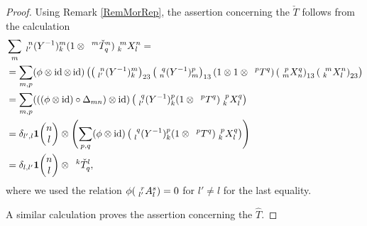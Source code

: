 \begin{proof}
 Using Remark \ref{RemMorRep}, the assertion concerning the $\check{T}$ follows
  from the calculation
  \begin{align*}
    &\sum_{m} \Gr{(Y^{-1})}{n}{m}{l'}{k}(1 \otimes
    \Gru{\check{T}_q}{m}{n})\Gr{X}{m}{n}{k}{l} = \\
    &=\sum_{m,p} (\phi \otimes \id \otimes
    \id)\left(\left(\Gr{(Y^{-1})}{n}{m}{l'}{k}\right)_{23}
      \left(\Gr{(Y^{-1})}{q}{p}{n}{m}\right)_{13}(1 \otimes 1 \otimes
      \Gru{T}{p}{q})\left(\Gr{X}{p}{q}{m}{n}\right)_{13}\left(\Gr{X}{m}{n}{k}{l}\right)_{23}\right)
    \\
    &= \sum_{m,p} (\left((\phi \otimes \id)
    \circ \Delta_{mn}\right) \otimes \id)\left(\Gr{(Y^{-1})}{q}{p}{l'}{k}(1
      \otimes \Gru{T}{p}{q})\Gr{X}{p}{q}{k}{l}\right) 
    \\
    &= \delta_{l',l}\UnitC{n}{l}\otimes \left(\sum_{p,q} (\phi \otimes \id)\left(\Gr{(Y^{-1})}{q}{p}{l}{k}(1 
      \otimes \Gru{T}{p}{q})\Gr{X}{p}{q}{k}{l}\right)\right)\\
  &= \delta_{l,l'}\UnitC{n}{l} \otimes \Gru{\check{T}_q}{k}{l},
  \end{align*}
  where we used the relation $\phi(\Gr{A}{r}{s}{l'}{l})=0$ for $l'\neq l$
  for the last equality. 
  
  A similar calculation proves the assertion
  concerning the $\hat{T}$. 
\end{proof}


